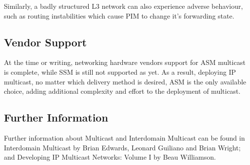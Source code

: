 Similarly, a badly structured L3 network can also experience adverse 
behaviour, such as routing instabilities which cause PIM to change it's
forwarding state.

\subsection{Vendor Support}

At the time or writing, networking hardware vendors support for ASM
multicast is complete, while SSM is still not supported as yet. As a
result, deploying IP multicast, no matter which delivery method is
desired, ASM is the only available choice, adding additional complexity
and effort to the deployment of multicast.

\subsection{Further Information}

Further information about Multicast and Interdomain Multicast can be
found in Interdomain Multicast by Brian Edwards, Leonard Guiliano and
Brian Wright; and Developing IP Multicast Networks: Volume I by Beau
Williamson.
